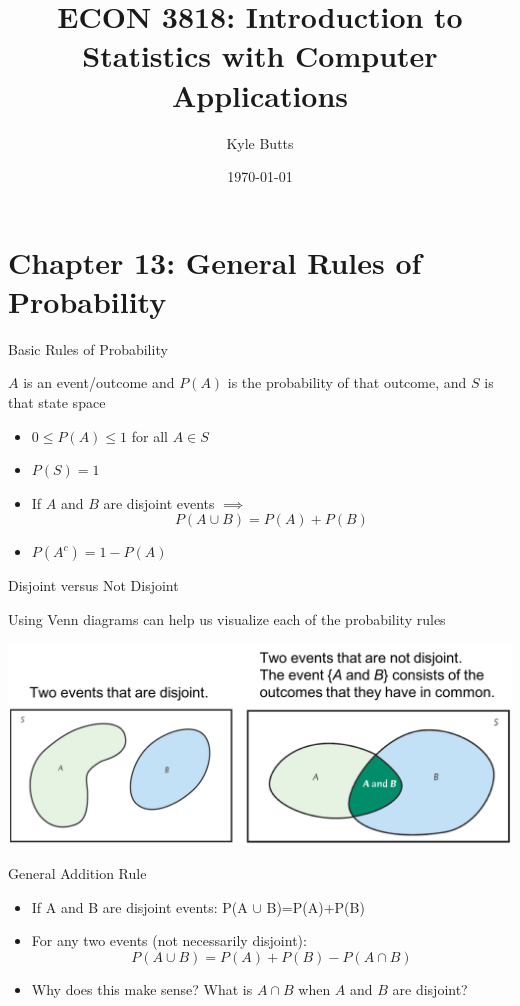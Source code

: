 \documentclass{beamer}
\title{ECON 3818: Introduction to Statistics with Computer Applications}
\date{\today}
\author{Kyle Butts}
\begin{document}
\maketitle




\section{Chapter 13: General Rules of Probability}
\begin{frame}{Basic Rules of Probability}
	
	$A$ is an event/outcome and $P(A)$ is the probability of that outcome, and $S$ is that state space
	\begin{itemize}
		
		\item $0 \leq P(A) \leq 1$ for all $A \in S$
		      
		\item $P(S)=1$
		      
		\item If $A$ and $B$ are disjoint events $\implies$ \[
			P(A \cup B) = P(A) + P(B)
		\]
		      
		\item $P(A^c) = 1 - P(A)$
	\end{itemize}
	
\end{frame}

\begin{frame}{Disjoint versus Not Disjoint}
	
	Using Venn diagrams can help us visualize each of the probability rules
	
	\includegraphics[width=\textwidth]{venndiagram}
\end{frame}

\begin{frame}{General Addition Rule}
	
	\begin{itemize}
		\item If A and B are disjoint events: P(A $\cup$ B)=P(A)+P(B)
		      
		\item For any two events (not necessarily disjoint): \[
			P(A \cup B) = P(A) + P(B)- P(A \cap B)
		\] 

		\item Why does this make sense? What is $A \cap B$ when $A$ and $B$ are disjoint?
	\end{itemize}
	
\end{frame}
\end{document}
